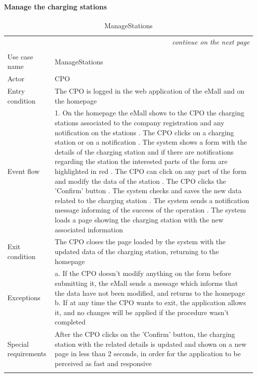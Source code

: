 \paragraph{Manage the charging stations}
\begin{center}
    \begin{longtable}{p{4cm} p{11cm}}
    \multicolumn{2}{r}{\itshape{continue on the next page}}\\
    \endfoot 
    \\
    \endlastfoot
    \hline
     Use case name &  ManageStations\\
     \hline
     Actor & CPO \\
     \hline
     Entry condition & The CPO is logged in the web application of the eMall and on the homepage \\
     \hline
     Event flow &   1. On the homepage the eMall shows to the CPO the charging stations associated to the company                   registration and any notification on the stations \newline
                    2. The CPO clicks on a charging station or on a notification \newline 
                    3. The system shows a form with the details of the charging station and if there are notifications regarding the station the interested parts of the form are highlighted in red \newline
                    4. The CPO can click on any part of the form and modify the data of the station \newline
                    5. The CPO clicks the 'Confirm' button \newline
                    6. The system checks and saves the new data related to the charging station \newline
                    7. The system sends a notification message informing of the success of the operation \newline
                    8. The system loads a page showing the charging station with the new associated information\\
     \hline
     Exit condition &  The CPO closes the page loaded by the system with the updated data of the charging station, returning to the homepage \\
     \hline
     Exceptions &   a. If the CPO doesn't modify anything on the form before submitting it, the eMall sends a                       message which informs that the data have not been modified, and returns to the homepage \newline
                    b. If at any time the CPO wants to exit, the application allows it, and no changes will be applied if the procedure wasn't completed \\
     \hline
     Special requirements & After the CPO clicks on the 'Confirm' button, the charging station with the related details is updated and shown on a new page in less than 2 seconds, in order for the application to be perceived as fast and responsive \\
     \hline
    \caption{ManageStations}
    \label{tab:ManageStations}
    \end{longtable}
\end{center}
